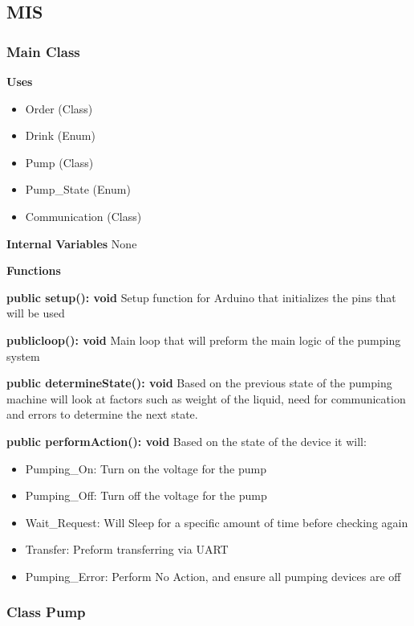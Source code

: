 \documentclass [10pt]{article}
\begin{document}
\subsection{MIS}

\subsubsection{Main Class}

\textbf{Uses}
\begin{itemize}
	\item Order (Class)
	\item Drink (Enum)
	\item Pump (Class)
	\item Pump\_State (Enum)
	\item Communication (Class)
\end{itemize}

\textbf{Internal Variables}
None

\textbf{Functions}

\textbf{public setup(): void}
Setup function for Arduino that initializes the pins that will be used 

\textbf{publicloop(): void}
Main loop that will preform the main logic of the pumping system

\textbf{public determineState(): void}
Based on the previous state of the pumping machine will look at factors such as weight of the liquid, need for communication and errors to determine the next state.

\textbf{public performAction(): void}
Based on the state of the device it will:
\begin{itemize}
	
	\item Pumping\_On: Turn on the voltage for the pump
	\item Pumping\_Off: Turn off the voltage for the pump
	
	\item Wait\_Request: Will Sleep for a specific amount of time before checking again
	\item Transfer: Preform transferring via UART
	\item Pumping\_Error: Perform No Action, and ensure all pumping devices are off
\end{itemize}

\subsubsection{Class Pump}
\end{document}
